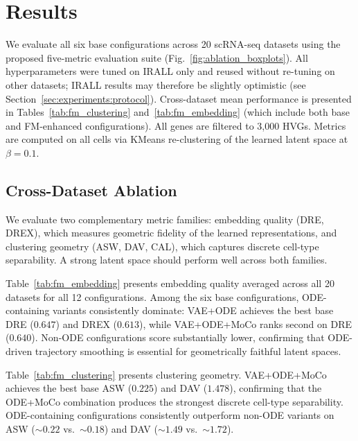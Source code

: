 \documentclass[journal]{IEEEtran}
\begin{document}
\section{Results}
\label{sec:results}

We evaluate all six base configurations across 20 scRNA-seq datasets using the proposed five-metric evaluation suite (Fig.~\ref{fig:ablation_boxplots}). All hyperparameters were tuned on IRALL only and reused without re-tuning on other datasets; IRALL results may therefore be slightly optimistic (see Section~\ref{sec:experiments:protocol}). Cross-dataset mean performance is presented in Tables~\ref{tab:fm_clustering} and~\ref{tab:fm_embedding} (which include both base and FM-enhanced configurations). All genes are filtered to 3{,}000 HVGs. Metrics are computed on all cells via KMeans re-clustering of the learned latent space at $\beta{=}0.1$.

\subsection{Cross-Dataset Ablation}
\label{sec:results:crossdataset}

We evaluate two complementary metric families: embedding quality (DRE, DREX), which measures geometric fidelity of the learned representations, and clustering geometry (ASW, DAV, CAL), which captures discrete cell-type separability. A strong latent space should perform well across both families.

Table~\ref{tab:fm_embedding} presents embedding quality averaged across all 20 datasets for all 12 configurations. Among the six base configurations, ODE-containing variants consistently dominate: VAE+ODE achieves the best base DRE ($0.647$) and DREX ($0.613$), while VAE+ODE+MoCo ranks second on DRE ($0.640$). Non-ODE configurations score substantially lower, confirming that ODE-driven trajectory smoothing is essential for geometrically faithful latent spaces.

Table~\ref{tab:fm_clustering} presents clustering geometry. VAE+ODE+MoCo achieves the best base ASW ($0.225$) and DAV ($1.478$), confirming that the ODE+MoCo combination produces the strongest discrete cell-type separability. ODE-containing configurations consistently outperform non-ODE variants on ASW (${\sim}0.22$ vs.\ ${\sim}0.18$) and DAV (${\sim}1.49$ vs.\ ${\sim}1.72$).
\end{document}
